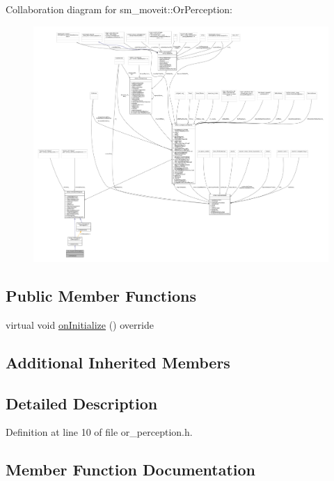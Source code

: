 Collaboration diagram for sm\+\_\+moveit\+:\+:Or\+Perception\+:
\nopagebreak
\begin{figure}[H]
\begin{center}
\leavevmode
\includegraphics[width=350pt]{classsm__moveit_1_1OrPerception__coll__graph}
\end{center}
\end{figure}
\subsection*{Public Member Functions}
\begin{DoxyCompactItemize}
\item 
virtual void \hyperlink{classsm__moveit_1_1OrPerception_af5721051a0575a4a1f3d50aef7f2bdba}{on\+Initialize} () override
\end{DoxyCompactItemize}
\subsection*{Additional Inherited Members}


\subsection{Detailed Description}


Definition at line 10 of file or\+\_\+perception.\+h.



\subsection{Member Function Documentation}
\mbox{\label{classsm__moveit_1_1OrPerception_af5721051a0575a4a1f3d50aef7f2bdba}} 
